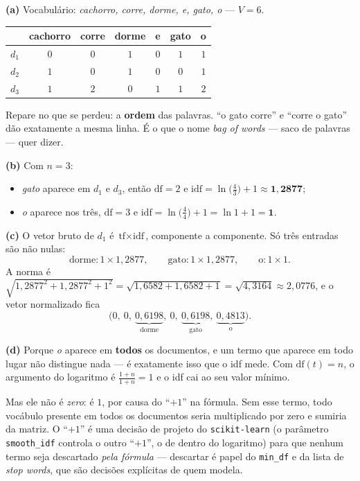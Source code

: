 \documentclass[11pt,a4paper]{article}
\begin{document}
\begin{solucao}
\textbf{(a)} Vocabulário: \emph{cachorro, corre, dorme, e, gato, o} --- $V=6$.
\begin{center}\small
\renewcommand{\arraystretch}{1.25}
\begin{tabular}{@{}lcccccc@{}}
\toprule
      & cachorro & corre & dorme & e & gato & o \\
\midrule
$d_1$ & $0$ & $0$ & $1$ & $0$ & $1$ & $1$ \\
$d_2$ & $1$ & $0$ & $1$ & $0$ & $0$ & $1$ \\
$d_3$ & $1$ & $2$ & $0$ & $1$ & $1$ & $2$ \\
\bottomrule
\end{tabular}
\end{center}
Repare no que se perdeu: a \textbf{ordem} das palavras. ``o gato corre'' e
``corre o gato'' dão exatamente a mesma linha. É o que o nome \emph{bag of
words} --- saco de palavras --- quer dizer.

\smallskip
\textbf{(b)} Com $n=3$:
\begin{itemize}[leftmargin=1.4cm]
  \item \emph{gato} aparece em $d_1$ e $d_3$, então $\mathrm{df}=2$ e
        $\mathrm{idf} = \ln\!\big(\tfrac{4}{3}\big)+1 \approx \mathbf{1{,}2877}$;
  \item \emph{o} aparece nos três, $\mathrm{df}=3$ e
        $\mathrm{idf} = \ln\!\big(\tfrac{4}{4}\big)+1 = \ln 1 + 1 = \mathbf{1}$.
\end{itemize}

\smallskip
\textbf{(c)} O vetor bruto de $d_1$ é
$\text{tf}\times\text{idf}$, componente a componente. Só três entradas são não
nulas:
\[
  \text{dorme}: 1\times 1{,}2877, \qquad
  \text{gato}: 1\times 1{,}2877, \qquad
  \text{o}: 1\times 1 .
\]
A norma é
$\sqrt{1{,}2877^2+1{,}2877^2+1^2} = \sqrt{1{,}6582+1{,}6582+1} = \sqrt{4{,}3164}
\approx 2{,}0776$, e o vetor normalizado fica
\[
  \Big(0,\ 0,\ \underbrace{0{,}6198}_{\text{dorme}},\ 0,\
   \underbrace{0{,}6198}_{\text{gato}},\ \underbrace{0{,}4813}_{\text{o}}\Big).
\]

\smallskip
\textbf{(d)} Porque \emph{o} aparece em \textbf{todos} os documentos, e um termo
que aparece em todo lugar não distingue nada --- é exatamente isso que o idf
mede. Com $\mathrm{df}(t)=n$, o argumento do logaritmo é $\tfrac{1+n}{1+n}=1$ e o
idf cai ao seu valor mínimo.

Mas ele não é \emph{zero}: é $1$, por causa do ``$+1$'' na fórmula. Sem esse
termo, todo vocábulo presente em todos os documentos seria multiplicado por zero
e sumiria da matriz. O ``$+1$'' é uma decisão de projeto do
\texttt{scikit-learn} (o parâmetro \texttt{smooth\_idf} controla o outro ``$+1$'',
o de dentro do logaritmo) para que nenhum termo seja descartado \emph{pela
fórmula} --- descartar é papel do \texttt{min\_df} e da lista de
\emph{stop words}, que são decisões explícitas de quem modela.
\end{solucao}
\end{document}

